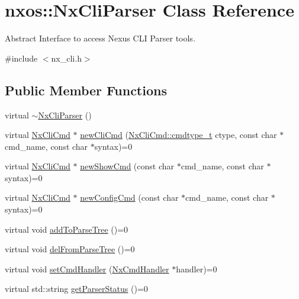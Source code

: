 \hypertarget{classnxos_1_1NxCliParser}{
\section{nxos::NxCliParser Class Reference}
\label{classnxos_1_1NxCliParser}
}


Abstract Interface to access Nexus CLI Parser tools.  


{\ttfamily \#include $<$nx\_\-cli.h$>$}\subsection*{Public Member Functions}
\begin{DoxyCompactItemize}
\item 
virtual \hyperlink{classnxos_1_1NxCliParser_ae7d5ada6ff25efd19ba95161fa60eeac}{$\sim$NxCliParser} ()
\item 
virtual \hyperlink{classnxos_1_1NxCliCmd}{NxCliCmd} $\ast$ \hyperlink{classnxos_1_1NxCliParser_a210cbbb8b312093285741f753c4cdcda}{newCliCmd} (\hyperlink{classnxos_1_1NxCliCmd_a82ed104f13c7859b24d3c0527f706be1}{NxCliCmd::cmdtype\_\-t} ctype, const char $\ast$cmd\_\-name, const char $\ast$syntax)=0
\item 
virtual \hyperlink{classnxos_1_1NxCliCmd}{NxCliCmd} $\ast$ \hyperlink{classnxos_1_1NxCliParser_ac07fa22d7d83d4c9015ea1f3976163d8}{newShowCmd} (const char $\ast$cmd\_\-name, const char $\ast$syntax)=0
\item 
virtual \hyperlink{classnxos_1_1NxCliCmd}{NxCliCmd} $\ast$ \hyperlink{classnxos_1_1NxCliParser_a51481c851ccf87288513ba73e0380895}{newConfigCmd} (const char $\ast$cmd\_\-name, const char $\ast$syntax)=0
\item 
virtual void \hyperlink{classnxos_1_1NxCliParser_a3c5295a4b2de3068d1653a6c303a22ee}{addToParseTree} ()=0
\item 
virtual void \hyperlink{classnxos_1_1NxCliParser_a169976099ecf7a05277bfc72259ff1bc}{delFromParseTree} ()=0
\item 
virtual void \hyperlink{classnxos_1_1NxCliParser_a711e36619a40625ebf62b59693529d88}{setCmdHandler} (\hyperlink{classnxos_1_1NxCmdHandler}{NxCmdHandler} $\ast$handler)=0
\item 
\hypertarget{classnxos_1_1NxCliParser_a5a6839c678451ecbb78449df6960cf8c}{
virtual std::string \hyperlink{classnxos_1_1NxCliParser_a5a6839c678451ecbb78449df6960cf8c}{getParserStatus} ()=0}
\label{classnxos_1_1NxCliParser_a5a6839c678451ecbb78449df6960cf8c}


\end{DoxyCompactItemize}
